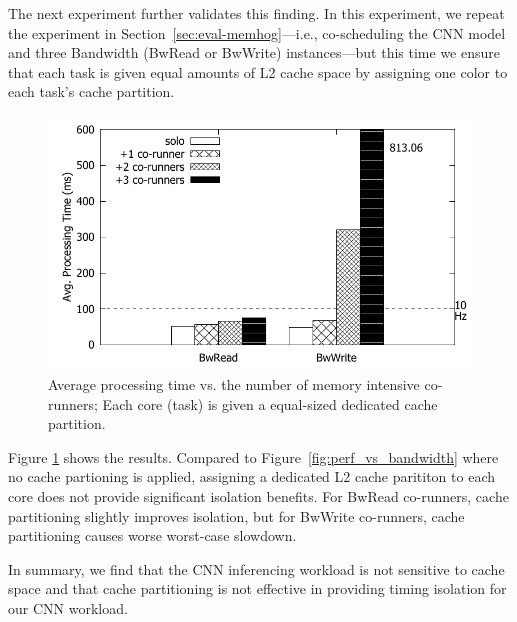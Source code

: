 The next experiment further validates this finding. In this
experiment, we repeat the experiment in
Section~\ref{sec:eval-memhog}---i.e., co-scheduling the CNN model and
three Bandwidth (BwRead or BwWrite) instances---but this time we
ensure that each task is given equal amounts of L2 cache space by
assigning one color to each task's cache partition.

\begin{figure}[h]
  \centering
  \includegraphics[width=.45\textwidth]{figs/palloc_bandwidth_exectime}
  \caption{Average processing time vs. the number of memory
intensive co-runners; Each core (task) is given a equal-sized
dedicated cache partition.}
  \label{fig:palloc_bandwidth_exectime}
\end{figure}

Figure \ref{fig:palloc_bandwidth_exectime} shows the
results. Compared to Figure~\ref{fig:perf_vs_bandwidth} where no cache
partioning is applied, assigning a dedicated L2 cache parititon to
each core does not provide significant isolation benefits. For BwRead
co-runners, cache partitioning slightly improves isolation, but for
BwWrite co-runners, cache partitioning causes worse worst-case
slowdown.

In summary, we find that the CNN inferencing workload is not sensitive
to cache space and that cache partitioning is not effective in
providing timing isolation for our CNN workload.



